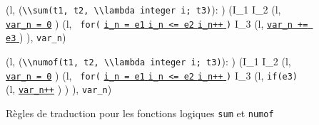 \begin{figure*}[h!]
  \scriptsize{
    {
      {
        \splitfrac
            {(l,
              (\mbox{\lstinline'\\sum(t1, t2, \\lambda integer i; t3)'}):
              )
              }
            {
              (I_1 \concat I_2
              \concat
              (l, \underline{\Zinit \mbox{\lstinline'var_n = 0'}} \semicolon )
              \concat
              (l, \mbox{\lstinline' for('}
              \underline{\Zinit \mbox{\lstinline'i_n = e1'} \Zclear}\semicolon
              \underline{\mbox{\lstinline'i_n <= e2'} \Zclear}\semicolon
              \underline{\mbox{\lstinline'i_n++'} \Zclear}
              \mbox{\lstinline')'} \bopen
              I_3
              \concat
              (l,
              \underline{\mbox{\lstinline'var_n += e3'} \Zclear}\semicolon )
              \bclose
              ),
              \mbox{\lstinline'var_n'})
            }
      }
    }

    {
      {
        \splitfrac
            {(l,
              (\mbox{\lstinline'\\numof(t1, t2, \\lambda integer i; t3)'}):
              )
              }
            {
              (I_1 \concat I_2
              \concat
              (l,
              \underline{\Zinit \mbox{\lstinline'var_n = 0'}}
              \semicolon )
              \concat
              (l, \mbox{\lstinline' for('}
              \underline{\Zinit \mbox{\lstinline'i_n = e1'} \Zclear}
              \semicolon
              \underline{\mbox{\lstinline'i_n <= e2'} \Zclear}
              \semicolon
              \underline{\mbox{\lstinline'i_n++'} \Zclear}
              \mbox{\lstinline')'} \bopen
              I_3
              \concat (l,
              \mbox{\lstinline'if(e3)'}
              \bopen
              (l, \underline{\mbox{\lstinline'var_n++'}} \semicolon)
              \bclose )
              \bclose
              ),
              \mbox{\lstinline'var_n'})
            }
      }
    }
  }
  \caption{Règles de traduction pour les fonctions logiques \lstinline'sum' et
    \lstinline'numof'}
  \label{fig:builtin}
\end{figure*}

